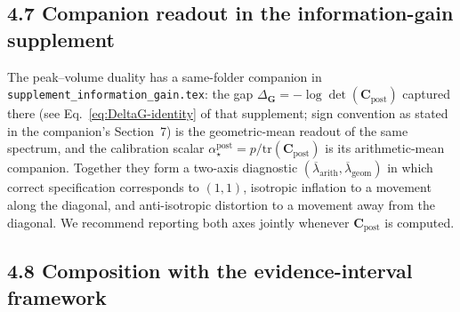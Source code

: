 \documentclass[11pt]{article}
\begin{document}
\subsection*{4.7 Companion readout in the information-gain supplement}

The peak--volume duality has a same-folder companion in
\texttt{supplement\_information\_gain.tex}: the gap
$\Delta_{\mathbf G} = -\log\det(\mathbf C_{\mathrm{post}})$ captured there
(see Eq.~\eqref{eq:DeltaG-identity} of that supplement; sign convention as
stated in the companion's Section~7) is the geometric-mean readout of the
same spectrum, and the calibration scalar
$\alpha_\star^{\mathrm{post}} = p/\mathrm{tr}(\mathbf C_{\mathrm{post}})$ is
its arithmetic-mean companion. Together they form a two-axis diagnostic
$(\overline\lambda_{\mathrm{arith}},\overline\lambda_{\mathrm{geom}})$ in
which correct specification corresponds to $(1,1)$, isotropic inflation to a
movement along the diagonal, and anti-isotropic distortion to a movement
away from the diagonal. We recommend reporting both axes jointly whenever
$\mathbf C_{\mathrm{post}}$ is computed.

\subsection*{4.8 Composition with the evidence-interval framework}
\end{document}
